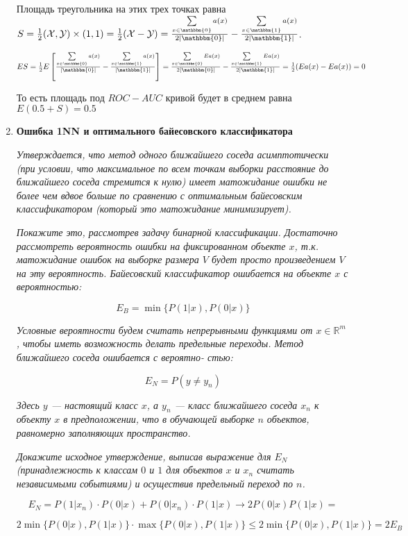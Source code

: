 \documentclass[]{book}
\theoremstyle{definition}
\begin{document}
\begin{enumerate}
Площадь треугольника на этих трех точках равна $S = \frac{1}{2}(\mathcal{X}, \mathcal{Y}) \times (1, 1) = \frac{1}{2} (\mathcal{X} - \mathcal{Y}) = \frac{\sum\limits_{x \in \mathbbm{0}} a(x)}{2|\mathbbm{0}|} - \frac{\sum\limits_{x \in \mathbbm{1}} a(x)}{2|\mathbbm{1}|}$.

$ES = \frac{1}{2} E \left [ \frac{\sum\limits_{x \in \mathbbm{0}} a(x)}{|\mathbbm{0}|} - \frac{\sum\limits_{x \in \mathbbm{1}} a(x)}{|\mathbbm{1}|} \right ] =  \frac{\sum\limits_{x \in \mathbbm{0}} E a(x)}{2|\mathbbm{0}|} - \frac{\sum\limits_{x \in \mathbbm{1}} E a(x)}{2|\mathbbm{1}|} = \frac{1}{2} (E a(x) - E a(x)) = 0$

То есть площадь под $ROC-AUC$ кривой будет в среднем равна $E(0.5 + S) = 0.5$

\item\label{4.3} \textbf{Ошибка 1NN и оптимального байесовского классификатора}

\textit{Утверждается, что метод одного ближайшего соседа асимптотически (при условии, что максимальное по всем точкам выборки расстояние до ближайшего соседа стремится к нулю) имеет
матожидание ошибки не более чем вдвое больше по сравнению с оптимальным байесовским
классификатором (который это матожидание минимизирует).}

\textit{Покажите это, рассмотрев задачу бинарной классификации. Достаточно рассмотреть вероятность ошибки на фиксированном объекте $x$, т.к. матожидание ошибок на выборке размера $V$ будет просто произведением $V$ на эту вероятность. Байесовский классификатор ошибается на объекте $x$ с вероятностью:}

$$E_B = \min\{P(1|x), P(0|x)\}$$

\textit{Условные вероятности будем считать непрерывными функциями от $x \in \mathbb{R}^m$   , чтобы иметь возможность делать предельные переходы. Метод ближайшего соседа ошибается с вероятно-
стью:}

$$E_N = P(y \ne y_n)$$

\textit{Здесь $y$  --- настоящий класс $x$, а $y_n$ --- класс ближайшего соседа $x_n$ к объекту $x$ в предположении, что в обучающей выборке $n$ объектов, равномерно заполняющих пространство.}

\textit{Докажите исходное утверждение, выписав выражение для $E_N$ (принадлежность к классам
$0$ и $1$ для объектов $x$ и $x_n$ считать независимыми событиями) и осуществив предельный
переход по $n$.}

$$E_N = P(1|x_n) \cdot P(0|x) + P(0|x_n) \cdot P(1|x) \to 2P(0|x)P(1|x) = $$

$$2\min \{P(0|x), P(1|x)\} \cdot \max \{P(0|x), P(1|x)\} \leqslant 2\min \{P(0|x), P(1|x)\} = 2E_B$$

\end{enumerate}
\end{document}
